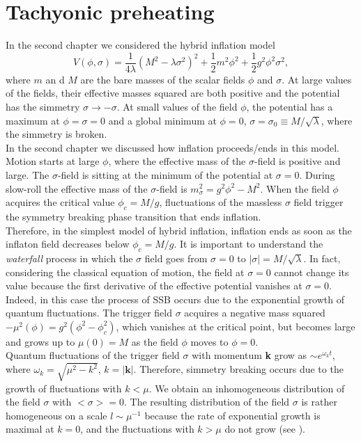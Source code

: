 \documentclass[11pt,a4paper,twoside]{book}
\begin{document}
\section{Tachyonic preheating}
In the second chapter we considered the hybrid inflation model
\begin{equation}
\label{Chap4:TachyonicPreheating_InflationModel}
V(\phi,\sigma)=\frac{1}{4\lambda}(M^{2}-\lambda\sigma^{2})^{2} + \frac{1}{2}m^{2}\phi^{2} + \frac{1}{2}g^{2}\phi^{2}\sigma^{2},
\end{equation}
where $ m $ an d $ M $ are the bare masses of the scalar fields $\phi$ and $\sigma$. At large values of the fields, their effective masses squared are both positive and the potential  has the simmetry $ \sigma \rightarrow -\sigma $. At small values of the field $\phi$, the potential has a maximum at $\phi=\sigma=0$ and a global minimum at $\phi=0$, $\sigma=\sigma_{0} \equiv M/\sqrt{\lambda}$, where the simmetry is broken.\\
In the second chapter we discussed how inflation proceeds/ends in this model. Motion starts at large $\phi$, where the effective mass of the $\sigma$-field is positive and large. The $\sigma$-field is sitting at the minimum of the potential at $\sigma=0$. During slow-roll the effective mass of the $\sigma$-field is $ m^{2}_{\sigma}=g^{2}\phi^{2}-M^{2} $. When the field $\phi$ acquires the critical value $ \phi_{c}=M/g $, fluctuations of the massless $\sigma$ field trigger the symmetry breaking phase transition that ends inflation.\\
Therefore, in the simplest model of hybrid inflation, inflation ends as soon as the inflaton field decreases below $ \phi_{c}=M/g $. It is important to understand the \textit{waterfall} process in which the $\sigma$ field goes from $ \sigma=0 $ to $ |\sigma|=M/\sqrt{\lambda} $. In fact, considering the classical equation of motion, the field  at $ \sigma = 0 $ cannot change its value because the first derivative of the effective potential vanishes at $ \sigma=0 $. Indeed, in this case the process of SSB occurs due to the exponential growth of quantum fluctuations. The trigger field $\sigma$ acquires a negative mass squared $ -\mu^{2}(\phi)=g^{2}(\phi^{2}-\phi_{c}^{2}) $, which vanishes at the critical point, but becomes large and grows up to $ \mu(0)=M $ as the field $\phi$ moves to $\phi=0$.\\
Quantum fluctuations of the trigger field $\sigma$ with momentum \textbf{k} grow as $\sim e^{\omega_{k} t}$, where $\omega_{k}=\sqrt{\mu^{2}-k^{2}}$, $ k=|\textbf{k}| $.  Therefore, simmetry breaking occurs due to the growth of fluctuations with $ k<\mu $. We obtain an inhomogeneous distribution of the field $\sigma$ with $ <\sigma>=0 $. The resulting distribution of the field $\sigma$ is rather homogeneous on a scale $ l\sim \mu^{-1} $ because the rate of exponential growth is maximal at $ k=0 $, and the fluctuations with $ k>\mu $ do not grow (see \cite{Chap4:TachyonicPreheating}).\\
\end{document}
